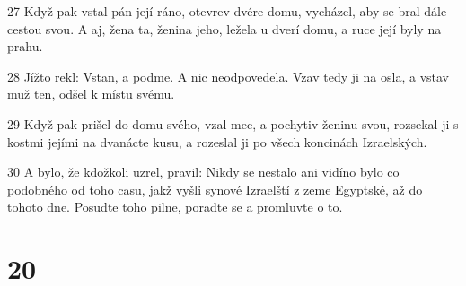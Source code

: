 \par 27 Když pak vstal pán její ráno, otevrev dvére domu, vycházel, aby se bral dále cestou svou. A aj, žena ta, ženina jeho, ležela u dverí domu, a ruce její byly na prahu.
\par 28 Jížto rekl: Vstan, a podme. A nic neodpovedela. Vzav tedy ji na osla, a vstav muž ten, odšel k místu svému.
\par 29 Když pak prišel do domu svého, vzal mec, a pochytiv ženinu svou, rozsekal ji s kostmi jejími na dvanácte kusu, a rozeslal ji po všech koncinách Izraelských.
\par 30 A bylo, že kdožkoli uzrel, pravil: Nikdy se nestalo ani vidíno bylo co podobného od toho casu, jakž vyšli synové Izraelští z zeme Egyptské, až do tohoto dne. Posudte toho pilne, poradte se a promluvte o to.

\chapter{20}

